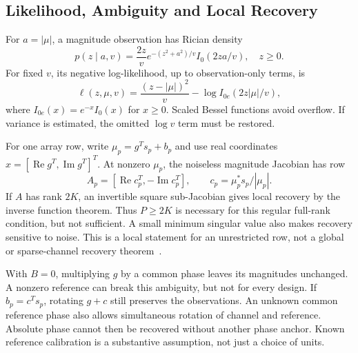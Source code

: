 \documentclass[10pt,journal,letterpaper]{IEEEtran}
\begin{document}
\subsection{Likelihood, Ambiguity and Local Recovery}
For $a=|\mu|$, a magnitude observation has Rician density
\begin{equation}
 p(z\mid a,v)=\frac{2z}{v}e^{-(z^2+a^2)/v}I_0(2za/v),\quad z\ge0.
\end{equation}
For fixed $v$, its negative log-likelihood, up to observation-only terms, is
\begin{equation}
 \ell(z,\mu,v)=\frac{(z-|\mu|)^2}{v}-\log I_{0e}(2z|\mu|/v),
 \label{eq:loss}
\end{equation}
where $I_{0e}(x)=e^{-x}I_0(x)$ for $x\ge0$. Scaled Bessel functions avoid overflow. If variance is estimated, the omitted $\log v$ term must be restored.

For one array row, write $\mu_p=g^Ts_p+b_p$ and use real coordinates $x=[\operatorname{Re}g^T,\operatorname{Im}g^T]^T$. At nonzero $\mu_p$, the noiseless magnitude Jacobian has row
\begin{equation}
 A_p=[\operatorname{Re}c_p^T,-\operatorname{Im}c_p^T],\qquad
 c_p=\mu_p^*s_p/|\mu_p|.
 \label{eq:jacobian}
\end{equation}
If $A$ has rank $2K$, an invertible square sub-Jacobian gives local recovery by the inverse function theorem. Thus $P\ge2K$ is necessary for this regular full-rank condition, but not sufficient. A small minimum singular value also makes recovery sensitive to noise. This is a local statement for an unrestricted row, not a global or sparse-channel recovery theorem~\cite{gao2018}.

With $B=0$, multiplying $g$ by a common phase leaves its magnitudes unchanged. A nonzero reference can break this ambiguity, but not for every design. If $b_p=c^Ts_p$, rotating $g+c$ still preserves the observations. An unknown common reference phase also allows simultaneous rotation of channel and reference. Absolute phase cannot then be recovered without another phase anchor. Known reference calibration is a substantive assumption, not just a choice of units.
\end{document}
